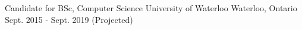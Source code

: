 


\vspace{0.5ex}


\begin{cventries}


\shortcventry                                                                                                                                                                                                                                                                                                                                                                                                                                                                                                                                                                                                                                                                                                                                                                                                                                                                                                                                                                                                                                                                                                                                                                                                                                                                                                                                                                                                                                                                                                                                                                                                                                                                                                                                                                                                                                                                                                                                                                                
{Candidate for BSc, Computer Science } %
{University of Waterloo} %
{Waterloo, Ontario} %
{Sept. 2015 - Sept. 2019 (Projected) } %


\end{cventries}
